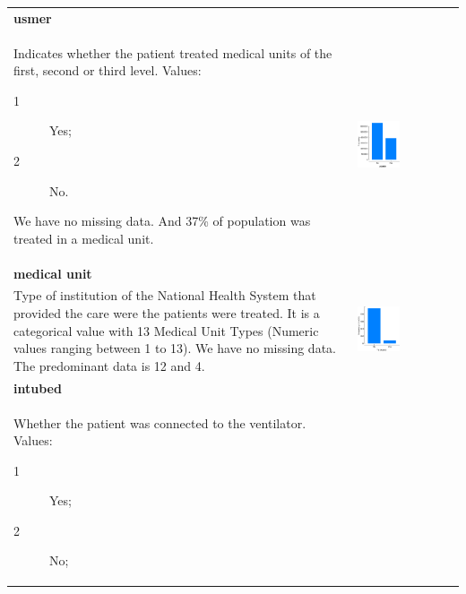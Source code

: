 \begin{longtable}{P{0.45\textwidth}P{0.45\textwidth}}
\\ \hline
\textbf{usmer} & \\
Indicates whether the patient treated medical units of the first, second or third level. Values:
\begin{description}
    \item[1] Yes;
    \item[2] No.
\end{description}
We have no missing data.
And 37\% of population was treated in a medical unit.
& \includegraphics[width=0.44\textwidth]{img/appendix/feature_usmer.png} 
\\ \hline
\textbf{medical unit} & \\
Type of institution of the National Health System that provided the care were
the patients were treated. 
It is a categorical value with 13 Medical Unit Types (Numeric values ranging
between 1 to 13).
We have no missing data.
The predominant data is 12 and 4.
& \includegraphics[width=0.44\textwidth]{img/appendix/feature_tobacco.png} 
\\ \hline
\textbf{intubed} & \\
Whether the patient was connected to the ventilator. Values:
\begin{description}
    \item[1] Yes;
    \item[2] No;

\end{description}
\end{longtable}
